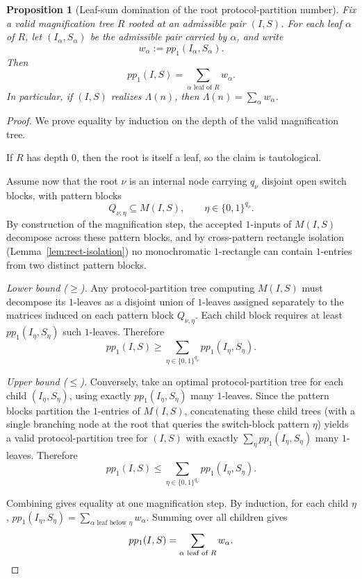\documentclass[11pt]{article}
\newtheorem{proposition}[theorem]{Proposition}
\begin{document}
\begin{proposition}[Leaf-sum domination of the root protocol-partition number]
\label{prop:leaf-sum-domination}
Fix a valid magnification tree $R$ rooted at an admissible pair $(I, S)$. For each leaf $\alpha$ of
$R$, let $(I_\alpha, S_\alpha)$ be the admissible pair carried by $\alpha$, and write
\[
w_\alpha := pp_1(I_\alpha, S_\alpha).
\]
Then
\[
pp_1(I, S) = \sum_{\alpha \text{ leaf of } R} w_\alpha.
\]
In particular, if $(I, S)$ realizes $\Lambda(n)$, then $\Lambda(n) = \sum_\alpha w_\alpha$.
\end{proposition}

\begin{proof}
We prove equality by induction on the depth of the valid magnification
tree.

If $R$ has depth $0$, then the root is itself a leaf, so the claim is
tautological.

Assume now that the root $\nu$ is an internal node carrying $q_\nu$
disjoint open switch blocks, with pattern blocks
\[
Q_{\nu,\eta} \subseteq M(I, S),\qquad \eta \in \{0,1\}^{q_\nu}.
\]
By construction of the magnification step, the accepted $1$-inputs of
$M(I, S)$ decompose across these pattern blocks, and by cross-pattern
rectangle isolation
(Lemma~\ref{lem:rect-isolation}) no monochromatic
$1$-rectangle can contain $1$-entries from two distinct pattern blocks.

\emph{Lower bound ($\ge$).}
Any protocol-partition tree computing $M(I, S)$ must decompose its
$1$-leaves as a disjoint union of $1$-leaves assigned separately to the
matrices induced on each pattern block $Q_{\nu,\eta}$.  Each child block
requires at least $pp_1(I_\eta, S_\eta)$ such $1$-leaves.  Therefore
\[
pp_1(I, S) \ge \sum_{\eta \in \{0,1\}^{q_\nu}} pp_1(I_\eta, S_\eta).
\]

\emph{Upper bound ($\le$).}
Conversely, take an optimal protocol-partition tree for each child
$(I_\eta, S_\eta)$, using exactly $pp_1(I_\eta, S_\eta)$ many
$1$-leaves.  Since the pattern blocks partition the $1$-entries of
$M(I, S)$, concatenating these child trees (with a single branching node
at the root that queries the switch-block pattern $\eta$) yields a valid
protocol-partition tree for $(I, S)$ with exactly
$\sum_\eta pp_1(I_\eta, S_\eta)$ many $1$-leaves.  Therefore
\[
pp_1(I, S) \le \sum_{\eta \in \{0,1\}^{q_\nu}} pp_1(I_\eta, S_\eta).
\]

Combining gives equality at one magnification step.  By induction, for
each child $\eta$,
$pp_1(I_\eta, S_\eta) = \sum_{\alpha \text{ leaf below } \eta} w_\alpha$.
Summing over all children gives
\[
pp_1(I, S) = \sum_{\alpha \text{ leaf of } R} w_\alpha. \qedhere
\]
\end{proof}
\end{document}

